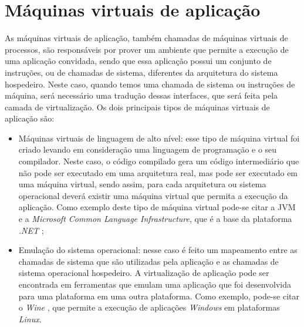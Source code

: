 \section{Máquinas virtuais de aplicação}
\label{section:virtaplicacao}

As máquinas virtuais de aplicação, também chamadas de máquinas virtuais de processos, são responsáveis por prover um ambiente que permite 
a execução de uma aplicação convidada, sendo que essa aplicação possui um conjunto de instruções, ou de chamadas de sistema, diferentes da 
arquitetura do sistema hospedeiro. Neste caso, quando temos uma chamada de sistema ou instruções de máquina, será necessário uma 
tradução dessas interfaces, que será feita pela camada de virtualização. Os dois principais tipos de máquinas virtuais de aplicação são:

\begin{itemize}
 \item Máquinas virtuais de linguagem de alto nível: esse tipo de máquina virtual foi criado levando em consideração uma linguagem de 
 programação e o seu compilador. Neste caso, o código compilado gera um código intermediário que não pode ser executado em uma arquitetura real, 
 mas pode ser executado em uma máquina virtual, sendo assim, para cada arquitetura ou sistema operacional deverá existir uma máquina virtual que
 permita a execução da aplicação. Como exemplo deste tipo de máquina virtual pode-se citar a \ac{JVM} e a 
 \textit{Microsoft Common Language Infrastructure}, que é a base da plataforma \textit{.NET} \cite{carissimi2008};
 \item Emulação do sistema operacional: nesse caso é feito um mapeamento entre as chamadas de sistema que são utilizadas pela aplicação e as 
 chamadas de sistema operacional hospedeiro. A virtualização de aplicação pode ser encontrada em ferramentas que emulam uma aplicação que foi
 desenvolvida para uma plataforma em uma outra plataforma. Como exemplo, pode-se citar o \textit{Wine} \cite{wine}, que permite a execução de 
 aplicações \textit{Windows} em plataformas \textit{Linux}.
\end{itemize}


